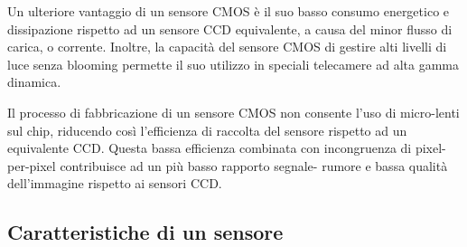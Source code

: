 Un ulteriore vantaggio di un sensore CMOS è il suo basso consumo energetico e
dissipazione rispetto ad un sensore CCD equivalente, a causa del minor flusso
di carica, o corrente. Inoltre, la capacità del sensore CMOS di gestire alti
livelli di luce senza blooming permette il suo utilizzo in speciali telecamere
ad alta gamma dinamica.

Il processo di fabbricazione di un sensore CMOS non consente l'uso di
micro-lenti sul chip, riducendo così l'efficienza di raccolta  del sensore
rispetto ad un equivalente CCD. Questa bassa efficienza combinata con
incongruenza di pixel-per-pixel contribuisce ad un più basso rapporto segnale-
rumore e bassa qualità dell'immagine rispetto ai sensori CCD.

\subsection{Caratteristiche di un sensore}

